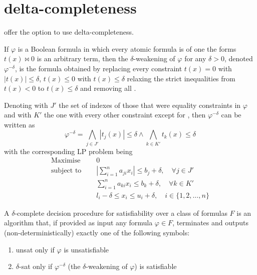\documentclass[runningheads]{llncs}
\begin{document}
\section{delta-completeness}

\dlinear offer the option to use delta-completeness.

\begin{definition}
    If $\varphi$ is a Boolean formula in which every atomic formula is of one the forms $t(x) \bowtie 0$ is an arbitrary term, then the $\delta$-weakening of $\varphi$ for any $\delta > 0$, denoted $\varphi^{-\delta}$, is the formula obtained by replacing every constraint $t(x) = 0$ with $|t(x)| \le \delta$, $t(x) \le 0$ with $t(x) \le \delta$ relaxing the strict inequalities from $t(x) < 0$ to $t(x) \le \delta$ and removing all \nqcs.
\end{definition}
Denoting with $J'$ the set of indexes of those that were equality constraints in $\varphi$ and with $K'$ the one with every other constraint except for \nqcs, then $\varphi^{-\delta}$ can be written as
\begin{equation*}
    \varphi^{-\delta} = \bigwedge_{j \in J'} |t_j(x)| \le \delta \wedge \bigwedge_{k \in K'} t_k(x) \le \delta
\end{equation*}
with the corresponding LP problem being
\begin{equation}
    \label{eq:delta-lp}
    \begin{split}
        \text{Maximise }   \quad & 0                                                                                \\
        \text{subject to } \quad & \left|\sum_{i=1}^{n} a_{ji}x_{i}\right| \le b_j + \delta, \quad \forall j \in J' \\
        \quad                    & \sum_{i=1}^{n} a_{ki}x_{i} \le b_k + \delta, \quad \forall k \in K'              \\
        \quad                    & l_i - \delta \le x_i \le u_i + \delta,  \quad i \in \{1, 2, \ldots, n\}
    \end{split}
\end{equation}
\begin{definition}
    A $\delta$-complete decision procedure for satisfiability over a class of formulas $F$ is an algorithm that, if provided as input any formula $\varphi \in F$, terminates and outputs (non-deterministically) exactly one of the following symbols:
    \begin{enumerate}
        \item unsat only if $\varphi$ is unsatisfiable
        \item $\delta$-sat only if $\varphi^{-\delta}$ (the $\delta$-weakening of $\varphi$) is satisfiable
    \end{enumerate}
\end{definition}
\end{document}
